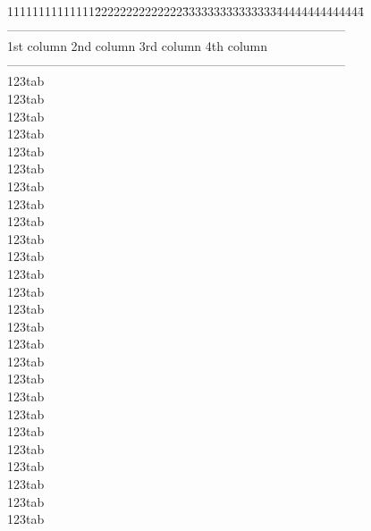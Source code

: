 \documentclass[phd,showframe]{ndsu-thesis-2022}
\begin{document}
\begingroup
\singlespacing
\begin{tabbing}
11111111111111\=22222222222222\=333333333333333\=44444444444444\=\kill
\>---------------------------------------------------------------------------------\\
\>\: 1st column  \>  2nd column  \>  3rd column \> 4th column\\
\>---------------------------------------------------------------------------------\\
\>\: 123tab      \\
\>\: 123tab      \\
\>\: 123tab      \\
\>\: 123tab      \\
\>\: 123tab      \\
\>\: 123tab      \\
\>\: 123tab      \\
\>\: 123tab      \\
\>\: 123tab      \\
\>\: 123tab      \\
\>\: 123tab      \\
\>\: 123tab      \\
\>\: 123tab    \\
\>\: 123tab    \\
\>\: 123tab    \\
\>\: 123tab    \\
\>\: 123tab    \\
\>\: 123tab    \\
\>\: 123tab    \\
\>\: 123tab    \\
\>\: 123tab    \\
\>\: 123tab    \\
\>\: 123tab    \\
\>\: 123tab    \\
\>\: 123tab    \\
\>\: 123tab    \\

\end{tabbing}
\end{document}
